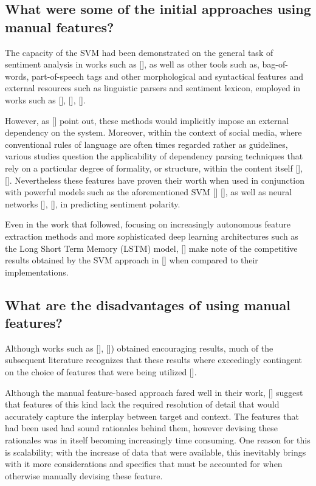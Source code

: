 \documentclass[12pt, a4paper]{report}
\theoremstyle{definition}
\theoremstyle{definition}%
\theoremstyle{definition}%
\theoremstyle{definition}%
\theoremstyle{definition}%
\theoremstyle{definition}%
\renewcommand{\cite}[1]{[\citealp{#1}]}
\begin{document}
\subsection{What were some of the initial approaches using manual features?}
The capacity of the SVM had been demonstrated on the general task of sentiment analysis in works such as \cite{pang2002}, as well as other tools such as, bag-of-words, part-of-speech tags and other morphological and syntactical features and external resources such as linguistic parsers and sentiment lexicon, employed in works such as \cite{dong}, \cite{vo2015}, \cite{nguyen2015}.

However, as \cite{tang2016b} point out, these methods would implicitly impose an external dependency on the system. Moreover, within the context of social media, where conventional rules of language are often times regarded rather as guidelines, various studies question the applicability of dependency parsing techniques that rely on a particular degree of formality, or structure, within the content itself \cite{tang2016b}, \cite{chen2017}. Nevertheless these features have proven their worth when used in conjunction with powerful models such as the aforementioned SVM \cite{kiritchenko} \cite{wagner2014}, as well as neural networks \cite{dong}, \cite{vo2015}, in predicting sentiment polarity.

Even in the work that followed, focusing on increasingly autonomous feature extraction methods and more sophisticated deep learning architectures such as the Long Short Term Memory (LSTM) model, \cite{tang2016b} make note of the competitive results obtained by the SVM approach in \cite{kiritchenko} when compared to their implementations.

\subsection{What are the disadvantages of using manual features?}
Although works such as \cite{kiritchenko}, \cite{wagner2014}) obtained encouraging results, much of the subsequent literature recognizes that these results where exceedingly contingent on the choice of features that were being utilized \cite{tang2016b}.

Although the manual feature-based approach fared well in their work, \cite{tang2016b} suggest that features of this kind lack the required resolution of detail that would accurately capture the interplay between target and context. The features that had been used had sound rationales behind them, however devising these rationales was in itself becoming increasingly time consuming. One reason for this is scalability; with the increase of data that were available, this inevitably brings with it more considerations and specifics that must be accounted for when otherwise manually devising these feature.
\end{document}
